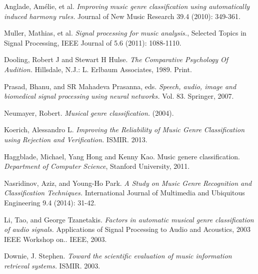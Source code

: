 \begin{thebibliography}{9}
                Anglade, Amélie, et al. 
                \emph{Improving music genre classification using automatically induced harmony rules.} 
                Journal of New Music Research 39.4 (2010): 349-361.

                Muller, Mathias, et al. 
                \emph{Signal processing for music analysis.}, 
                Selected Topics in Signal Processing, IEEE Journal of 5.6 (2011): 1088-1110.

                Dooling, Robert J and Stewart H Hulse. 
                \emph{The Comparative Psychology Of Audition.} 
                Hillsdale, N.J.: L. Erlbaum Associates, 1989. Print.

                Prasad, Bhanu, and SR Mahadeva Prasanna, eds. 
                \emph{Speech, audio, image and biomedical signal processing using neural networks.} 
                Vol. 83. Springer, 2007.

                Neumayer, Robert. 
                \emph{Musical genre classification.} 
                (2004).

                Koerich, Alessandro L. 
                \emph{Improving the Reliability of Music Genre Classification using Rejection and Verification.} 
                ISMIR. 2013.

                Haggblade, Michael, Yang Hong and Kenny Kao. Music genere classification.
                \emph{Department of Computer Science},
                Stanford University,
                2011.

                Nasridinov, Aziz, and Young-Ho Park. 
                \emph{A Study on Music Genre Recognition and Classification Techniques.} 
                International Journal of Multimedia and Ubiquitous Engineering 9.4 (2014): 31-42.

                Li, Tao, and George Tzanetakis. 
                \emph{Factors in automatic musical genre classification of audio signals.} 
                Applications of Signal Processing to Audio and Acoustics, 2003 IEEE Workshop on.. IEEE, 2003.

                Downie, J. Stephen. 
                \emph{Toward the scientific evaluation of music information retrieval systems.} 
                ISMIR. 2003.


\end{thebibliography}
